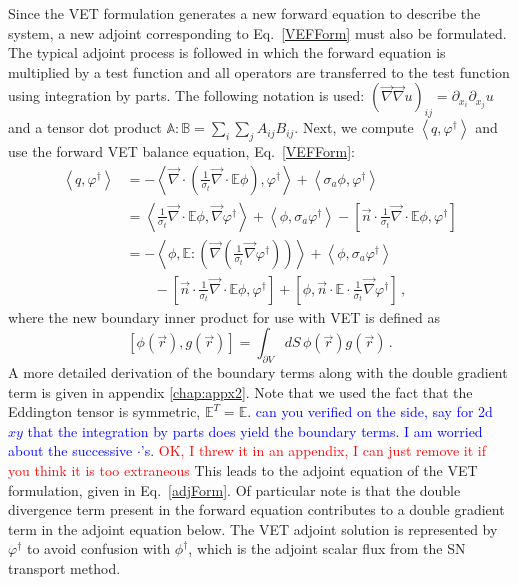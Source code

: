 \documentclass[12pt]{report}
\newcommand{\vr}{\vec{r}}
\newcommand{\bra}{\left\langle}
\newcommand{\ket}{\right\rangle}
\newcommand{\sbra}{\left[}
\newcommand{\sket}{\right]}
\renewcommand{\div}{\vec{\nabla} \cdot}
\newcommand{\grad}{\vec{\nabla}}
\newcommand{\vefadj}{\varphi^\dag}
\newcommand{\vn}{\vec{n}}
\newcommand{\Edd}{\mathbb{E}}
\newcommand{\sigt}{\sigma_t}
\newcommand{\siga}{\sigma_a}
\newcommand{\scalSource}{q}
\newcommand{\comment}[2]{\marginpar{\textcolor{#2}{$\star$}}\textcolor{#2}{#1}\newline}
\newcommand{\iwh}[1]{\comment{#1}{red}}
\newcommand{\jcr}[1]{\comment{#1}{blue}}
\newcommand{\iwh}[1]{\phantom{a}}
\newcommand{\jcr}[1]{\phantom{a}}
\begin{document}
Since the VET formulation generates a new forward equation to describe the system, a new adjoint corresponding to Eq.~\eqref{VEFForm} must also be formulated. The typical adjoint process is followed in which the forward equation is multiplied by a test function and all operators are transferred to the test function using integration by parts. The following notation is used: $(\grad \grad u)_{ij} = \partial_{x_i} \partial_{x_j} u$
and a tensor dot product $\mathbb{A} : \mathbb{B} = \sum_i \sum_j A_{ij}B_{ij}$.
Next, we compute $\bra \scalSource , \vefadj \ket$ and use the forward VET balance equation, Eq.~\eqref{VEFForm}:
\begin{equation}
\label{VEFadjFormDeriv}
\begin{split}
\bra \scalSource , \vefadj \ket &= - \bra \div \left( \frac{1}{\sigt}\div \Edd \phi \right), \vefadj \ket +  \bra \siga \phi, \vefadj \ket   \\
&= \bra \frac{1}{\sigt}\div \Edd \phi, \grad \vefadj \ket  +  \bra  \phi, \siga \vefadj \ket - \sbra \vn \cdot \frac{1}{\sigt}\div \Edd \phi, \vefadj \sket   \\
 &=  - \bra \phi, \Edd : \left( \grad \left( \frac{1}{\sigt}\grad \vefadj \right) \right) \ket  +  \bra  \phi, \siga \vefadj \ket \\
 &\quad\quad  - \sbra \vn \cdot  \frac{1}{\sigt}\div \Edd \phi, \vefadj \sket + \sbra \phi, \vn \cdot  \Edd \cdot \frac{1}{\sigt} \grad \vefadj \sket  \,,
\end{split}
\end{equation}
where the new boundary inner product for use with VET is defined as
\begin{equation}
\sbra \phi(\vr) , g(\vr)  \sket = \int_{\partial V} dS \, \phi (\vr) g (\vr)  \,.
\end{equation}
A more detailed derivation of the boundary terms along with the double gradient term is given in appendix \ref{chap:appx2}. Note that we used the fact that the Eddington tensor is symmetric, $\Edd^T=\Edd$.
\jcr{can you verified on the side, say for 2d $xy$ that the integration by parts does yield the boundary terms. I am worried about the successive $\cdot$'s.}
\iwh{OK, I threw it in an appendix, I can just remove it if you think it is too extraneous} 
This leads to the adjoint equation of the VET formulation, given in Eq.~\eqref{adjForm}. Of particular note is that the double divergence term present in the forward equation contributes to a double gradient term in the adjoint equation below. The VET adjoint solution is represented by $\vefadj$ to avoid confusion with $\phi^\dag$, which is the adjoint scalar flux from the SN transport  method. 
\end{document}
